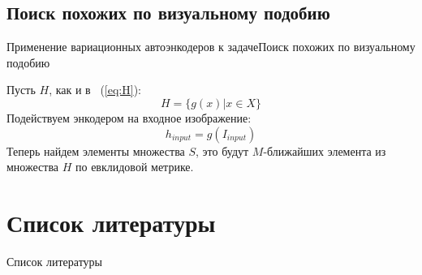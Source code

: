 \documentclass{beamer}
\begin{document}
\subsection{Поиск похожих по визуальному подобию}

\begin{frame}{Применение вариационных автоэнкодеров к задаче}{Поиск похожих по визуальному подобию}

Пусть $H$, как и в ~(\ref{eq:H}): $$H = \{g(x) | x \in X\}$$
Подействуем энкодером на входное изображение: $$h_{input} = g(I_{input})$$
Теперь найдем элементы множества $S$, это будут $M$-ближайших элемента из множества $H$ по евклидовой метрике.

\end{frame}

\section{Список литературы}

\begin{frame}{Список литературы}


\nocite{*}
\end{frame}
\end{document}

